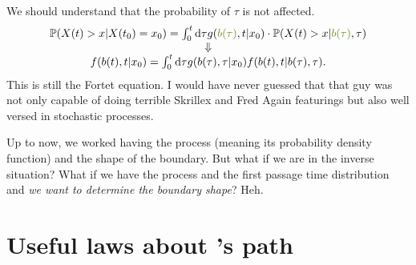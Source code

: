 \documentclass[12pt]{report}
\begin{document}
We should understand that the probability of $\tau$ is not affected.
\begin{equation*}
	\begin{array}{c}
		\pr(X(t)>x|X(t_{0})=x_0)=\int_{0}^{t}\dif\tau g(\mathcolor{OliveDrab4}{b(\tau)},t|x_{0})\cdot\pr(X(t)>x|\mathcolor{OliveDrab4}{b(\tau)},\tau)\\
		\Downarrow\\
		f(b(t),t|x_{0})=\int_{0}^{t}\dif\tau g(b(\tau),\tau|x_{0})f(b(t),t|b(\tau),\tau).
	\end{array}
\end{equation*}
This is still the Fortet equation. I would have never guessed that that guy was not only capable of doing terrible Skrillex and Fred Again featurings but also well versed in stochastic processes.\par
Up to now, we worked having the process (meaning its probability density function) and the shape of the boundary. But what if we are in the inverse situation? What if we have the process and the first passage time distribution and \textit{we want to determine the boundary shape}? Heh.
\section{Useful laws about \bwm's path}
\end{document}
